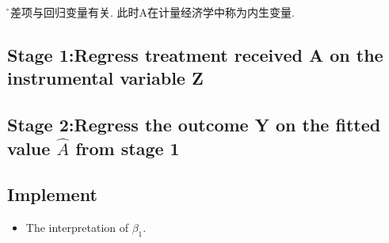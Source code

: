 \r{误差项与回归变量有关.} 此时A在计量经济学中称为内生变量.

\subsection{Stage 1:Regress treatment received A on the instrumental variable Z}
\subsection{Stage 2:Regress the outcome Y on the fitted value $\hat{A}$ from stage 1}

\subsection{Implement}
\begin{itemize}
	\item The interpretation of $\beta_1$.
	
\end{itemize}
%
%
%
%